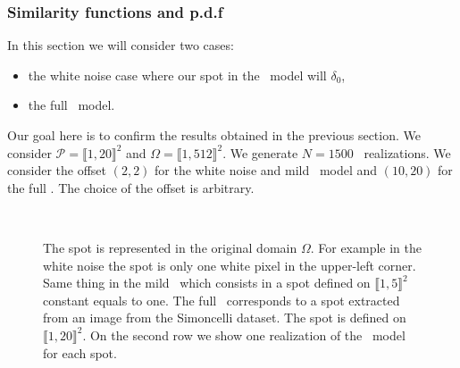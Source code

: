
  \subsubsection{Similarity functions and p.d.f}
  In this section we will consider two cases:
  \begin{itemize}
  \item the white noise case where our spot in the \ADSN \ model will $\delta_0$,
  \item the full \ADSN \ model.
  \end{itemize}
  Our goal here is to confirm the results obtained in the previous section.
  We consider $\mathcal{P} = \llbracket 1,20 \rrbracket^2$ and $\Omega = \llbracket 1,512 \rrbracket^2$. We generate $N=1500$ \ADSN \ realizations. We consider the offset $(2,2)$ for the white noise and mild \ADSN \ model and $(10,20)$ for the full \ADSN . The choice of the offset is arbitrary.
  \begin{figure}[H]
    \centering
     \hfill
     \hfill
     \\
     \hfill
     \hfill
     \hfill
    \caption{The spot is represented in the original domain $\Omega$. For example in the white noise the spot is only one white pixel in the upper-left corner. Same thing in the mild \ADSN \ which consists in a spot defined on $\llbracket 1,5 \rrbracket^2$ constant equals to one. The full \ADSN \ corresponds to a spot extracted from an image from the Simoncelli dataset. The spot is defined on $\llbracket 1,20\rrbracket^2$. On the second row we show one realization of the \ADSN \ model for each spot.}
    \label{fig:spot}    
  \end{figure}
